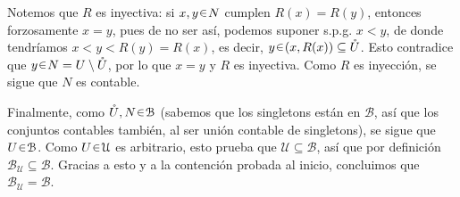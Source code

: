 \begin{sol}
Notemos que $R$ es inyectiva: si $x,y\en N$ cumplen $R(x) = R(y)$, entonces forzosamente $x=y$, pues de no ser así, podemos suponer s.p.g. $x<y$, de donde tendríamos $x < y < R(y) = R(x)$, es decir, $y\en (x,R(x)) \subseteq \mathring{U}$. Esto contradice que $y\en N=U \setminus \mathring{U}$, por lo que $x=y$ y $R$ es inyectiva. Como $R$ es inyección, se sigue que $N$ es contable.\par
Finalmente, como $\mathring{U},N \en \mathcal{B}$ (sabemos que los singletons están en $\mathcal{B}$, así que los conjuntos contables también, al ser unión contable de singletons), se sigue que $U\en\mathcal{B}$. Como $U\en\mathcal{U}$ es arbitrario, esto prueba que $\mathcal{U} \subseteq \mathcal{B}$, así que por definición $\mathcal{B}_\mathcal{U} \subseteq\mathcal{B}$. Gracias a esto y a la contención probada al inicio, concluimos que $\mathcal{B}_\mathcal{U} = \mathcal{B}$. 
\end{sol}